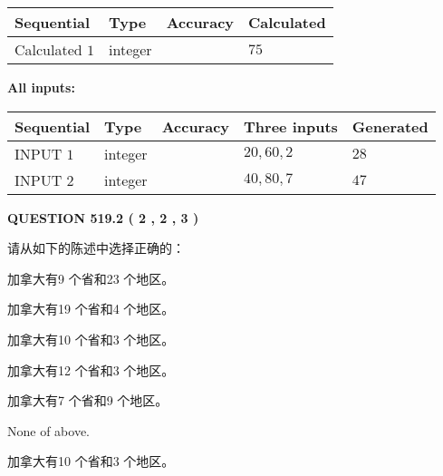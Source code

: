 \documentclass{ctexart}
\begin{document}
  
\noindent\begin{tabular}{|l|l|l|l|}
\hline
 Sequential & Type & Accuracy & Calculated \\ 
\hline
 
 
  Calculated $  1 $ & integer &  & 
  $ 75 $ 
 \\  \hline  
 \end{tabular}
   
   
   
   
\noindent\vspace{0.1in}\hspace{-0.08in} {\textbf{\Large{All inputs: }}}
   
   
  
  
\noindent\begin{tabular}{|l|l|l|l|l|}
\hline
 Sequential & Type & Accuracy & Three inputs & Generated \\ 
\hline
 
 
  INPUT $  1 $ & integer &  & $
 20
 , 
 60
 , 
 2
 $ & $ 28 $ 
 \\  \hline  
 
 
  INPUT $  2 $ & integer &  & $
 40
 , 
 80
 , 
 7
 $ & $ 47 $ 
 \\  \hline  
 \end{tabular}
   
   
  
\vspace{0.2in}
  
{\textbf{\Large{QUESTION
519.2 
 ( 2 , 2 , 3 )
}}}
  
  
请从如下的陈述中选择正确的：
 
 
加拿大有9 个省和23 个地区。
 
 
加拿大有19 个省和4 个地区。
 
 
加拿大有10 个省和3 个地区。
 
 
加拿大有12 个省和3 个地区。
 
 
加拿大有7 个省和9 个地区。
 
 
 None of above.
 
 
\noindent{}
 
 
加拿大有10 个省和3 个地区。
 
 
\noindent{}
 
\end{document}
